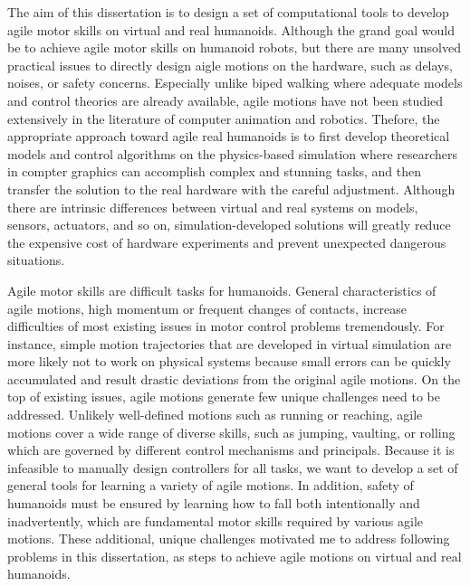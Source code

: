 The aim of this dissertation is to design a set of computational tools to
develop agile motor skills on virtual and real humanoids.
Although the grand goal would be to achieve agile motor skills on humanoid
robots, but there are many unsolved practical issues to directly design aigle
motions on the hardware, such as delays, noises, or safety concerns.
Especially unlike biped walking where adequate models and control theories are
already available, agile motions have not been studied extensively in the
literature of computer animation and robotics.
Thefore, the appropriate approach toward agile real humanoids is to first
develop theoretical models and control algorithms on the physics-based
simulation where researchers in compter graphics can accomplish complex and
stunning tasks, and then transfer the solution to the real hardware
with the careful adjustment.
Although there are intrinsic differences between virtual and real systems on
models, sensors, actuators, and so on, simulation-developed solutions will
greatly reduce the expensive cost of hardware experiments and prevent
unexpected dangerous situations.

Agile motor skills are difficult tasks for humanoids.
General characteristics of agile motions, high momentum or frequent changes
of contacts, increase difficulties of most existing issues in motor control
problems tremendously.
For instance, simple motion trajectories that are developed in virtual
simulation are more likely not to work on physical systems
because small errors can be quickly accumulated and result drastic deviations
from the original agile motions.
On the top of existing issues, agile motions generate few unique challenges
need to be addressed.
Unlikely well-defined motions such as running or reaching, agile motions cover
a wide range of diverse skills, such as jumping, vaulting, or rolling which are
governed by different control mechanisms and principals.
Because it is infeasible to manually design controllers for all tasks, we want
to develop a set of general tools for learning a variety of agile motions.
In addition, safety of humanoids must be ensured by learning how to fall
both intentionally and inadvertently, which are fundamental motor skills
required by various agile motions. 
These additional, unique challenges motivated me to address following problems
in this dissertation, as steps to achieve agile motions on virtual and real
humanoids.

